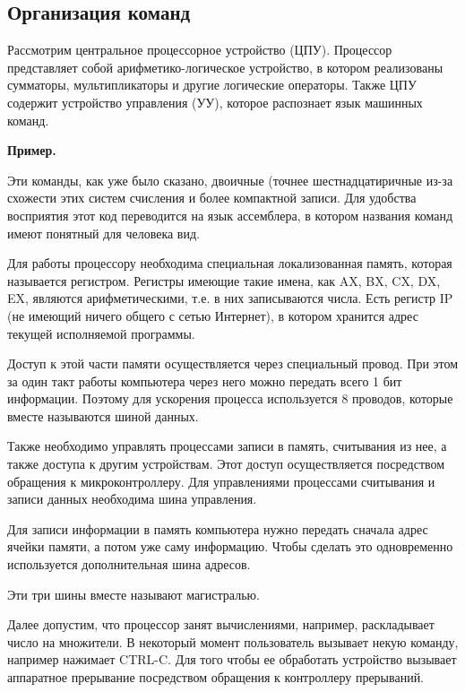 \documentclass[a4paper, fleqn]{article}
\newenvironment{example}[1][]{\medskip \noindent \textbf{Пример. #1}\par \nopagebreak}{\medskip \par} %
\begin{document}
		\subsection*{Организация команд}
		
			Рассмотрим центральное процессорное устройство (ЦПУ). Процессор представляет собой арифметико-логическое устройство, в котором реализованы сумматоры, мультипликаторы и другие логические операторы. Также ЦПУ содержит устройство управления (УУ), которое распознает язык машинных команд.
			
			\begin{example}
				Эти команды, как уже было сказано, двоичные (точнее шестнадцатиричные из-за схожести этих систем счисления и более компактной записи.
				Для удобства восприятия этот код переводится на язык ассемблера, в котором названия команд имеют понятный для человека вид.
			\end{example}
			
			Для работы процессору необходима специальная локализованная память, которая называется регистром. Регистры имеющие такие имена, как AX, BX, CX, DX, EX, являются арифметическими, т.е. в них записываются числа. Есть регистр IP (не имеющий ничего общего с сетью Интернет), в котором хранится адрес текущей исполняемой программы. 
			
			Доступ к этой части памяти осуществляется через специальный провод. При этом за один такт работы компьютера через него можно передать всего 1 бит информации. Поэтому для ускорения процесса используется 8 проводов, которые вместе называются шиной данных.
			
			Также необходимо управлять процессами записи в память, считывания из нее, а также доступа к другим устройствам. Этот доступ осуществляется посредством обращения к микроконтроллеру. Для управлениями процессами считывания и записи данных необходима шина управления. 
			
			Для записи информации в память компьютера нужно передать сначала адрес ячейки памяти, а потом уже саму информацию. Чтобы сделать это одновременно используется дополнительная шина адресов. 
			
			Эти три шины вместе называют магистралью. 
			
			Далее допустим, что процессор занят вычислениями, например, раскладывает число на множители. В некоторый момент пользователь вызывает некую команду, например нажимает CTRL-C. Для того чтобы ее обработать устройство вызывает аппаратное прерывание посредством обращения к контроллеру прерываний. 
			
\end{document}
